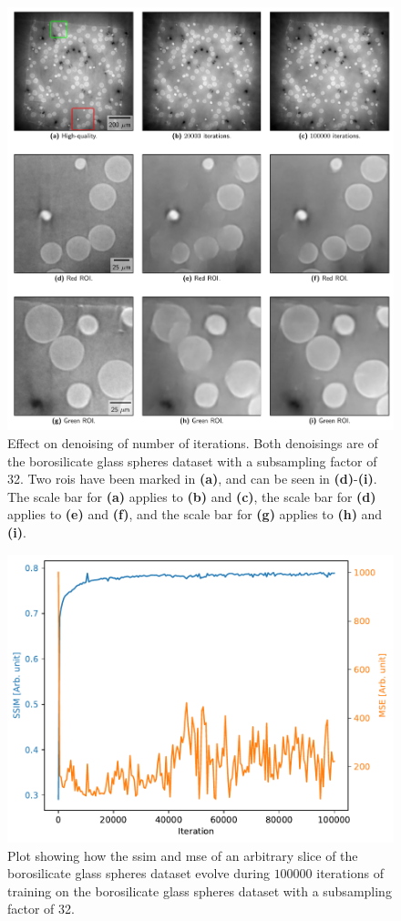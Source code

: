 \begin{figure}[htbp]
  \centering
  \includegraphics[width=.85\textwidth]{figures/iterationdenoisingcomparison.pdf}
  \caption[Effect on denoising of number of iterations]{Effect on denoising of number of iterations. Both denoisings are of the borosilicate glass spheres dataset with a subsampling factor of 32. Two \gls{roi}s have been marked in \textbf{(a)}, and can be seen in \textbf{(d)}-\textbf{(i)}. The scale bar for \textbf{(a)} applies to \textbf{(b)} and \textbf{(c)}, the scale bar for \textbf{(d)} applies to \textbf{(e)} and \textbf{(f)}, and the scale bar for \textbf{(g)} applies to \textbf{(h)} and \textbf{(i)}. }
  \label{fig:iterationdenoisingcomparison}
\end{figure}

\begin{figure}[htbp]
  \centering
  \includegraphics[width=.85\textwidth]{figures/ssimns32logcosh.pdf}
  \caption[SSIM and MSE evolution during training]{Plot showing how the \gls{ssim} and \gls{mse} of an arbitrary slice of the borosilicate glass spheres dataset evolve during $100000$ iterations of training on the borosilicate glass spheres dataset with a subsampling factor of 32. }
  \label{fig:ssimmseevolution}
\end{figure}

